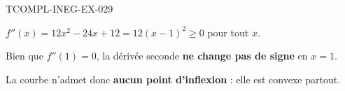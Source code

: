 \begin{corrige}{TCOMPL-INEG-EX-029}

$f''(x) = 12x^2 - 24x + 12 = 12(x-1)^2 \geq 0$ pour tout $x$.


Bien que $f''(1) = 0$, la dérivée seconde \textbf{ne change pas de signe} en $x=1$.

La courbe n'admet donc \textbf{aucun point d'inflexion} : elle est convexe partout.

\end{corrige}
